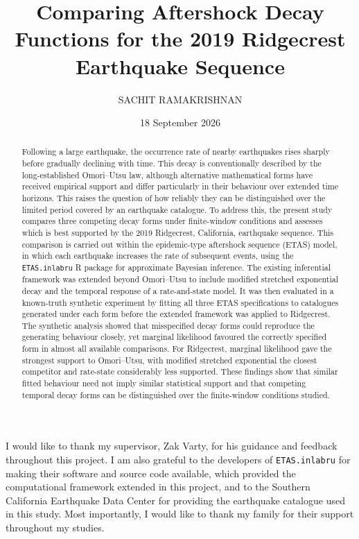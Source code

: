 \documentclass{statsmsc}
\title{Comparing Aftershock Decay Functions for the 2019 Ridgecrest Earthquake 
Sequence}
\author{SACHIT RAMAKRISHNAN}
\date{18 September 2026}
\begin{document}
\maketitle

\declarationdate{\today}
\declaration 

\begin{acknowledgements}
I would like to thank my supervisor, Zak Varty, for his guidance and feedback throughout this project. I am also grateful to the developers of \texttt{ETAS.inlabru} for making their software and source code available, which provided the computational framework extended in this project, and to the Southern California Earthquake Data Center for providing the earthquake catalogue used in this study. Most importantly, I would like to thank my family for their support throughout my studies.
\end{acknowledgements}

\mainmatter


\begin{abstract}
Following a large earthquake, the occurrence rate of nearby earthquakes rises sharply before gradually declining with time. This decay is conventionally described by the long-established Omori--Utsu law, although alternative mathematical forms have received empirical support and differ particularly in their behaviour over extended time horizons. This raises the question of how reliably they can be distinguished over the limited period covered by an earthquake catalogue. To address this, the present study compares three competing decay forms under finite-window conditions and assesses which is best supported by the 2019 Ridgecrest, California, earthquake sequence. This comparison is carried out within the epidemic-type aftershock sequence (ETAS) model, in which each earthquake increases the rate of subsequent events, using the \texttt{ETAS.inlabru} R package for approximate Bayesian inference. The existing inferential framework was extended beyond Omori--Utsu to include modified stretched exponential decay and the temporal response of a rate-and-state model. It was then evaluated in a known-truth synthetic experiment by fitting all three ETAS specifications to catalogues generated under each form before the extended framework was applied to Ridgecrest. The synthetic analysis showed that misspecified decay forms could reproduce the generating behaviour closely, yet marginal likelihood favoured the correctly specified form in almost all available comparisons. For Ridgecrest, marginal likelihood gave the strongest support to Omori--Utsu, with modified stretched exponential the closest competitor and rate-state considerably less supported. These findings show that similar fitted behaviour need not imply similar statistical support and that competing temporal decay forms can be distinguished over the finite-window conditions studied.
\end{abstract}
\end{document}
